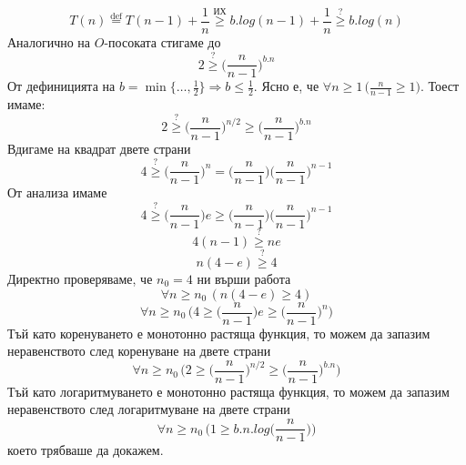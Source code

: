 \begin{solution}
\begin{itemize}
\begin{indstep}
			\begin{equation*}
				T(n)\overset{\text{def}}{=}T(n-1)+\frac1n\overset{\text{ИХ}}{\ge}b.log(n-1)+\frac1n\overset{?}{\ge}b.log(n)
			\end{equation*}
			Аналогично на $O$-посоката стигаме до
			\begin{equation*}
				2\overset{?}{\ge}\bigg(\frac{n}{n-1}\bigg)^{b.n}
			\end{equation*}
			От дефиницията на $b=\min\{\dots,\frac12\}\Rightarrow b\le\frac12$. Ясно е, че $\forall n\ge1\,\big(\frac{n}{n-1}\ge1\big)$. Тоест имаме:
			\begin{equation*}
				2\overset{?}{\ge}\bigg(\frac{n}{n-1}\bigg)^{n/2}\ge\bigg(\frac{n}{n-1}\bigg)^{b.n}
			\end{equation*}
			Вдигаме на квадрат двете страни
			\begin{equation*}
				4\overset{?}{\ge}\bigg(\frac{n}{n-1}\bigg)^n=\bigg(\frac{n}{n-1}\bigg)\bigg(\frac{n}{n-1}\bigg)^{n-1}
			\end{equation*}
			От анализа имаме
			\begin{equation*}
				4\overset{?}{\ge}\bigg(\frac{n}{n-1}\bigg)e\ge\bigg(\frac{n}{n-1}\bigg)\bigg(\frac{n}{n-1}\bigg)^{n-1}
			\end{equation*}
			\begin{equation*}
				4(n-1)\overset{?}{\ge}ne
			\end{equation*}
			\begin{equation*}
				n(4-e)\overset{?}{\ge}4
			\end{equation*}
			Директно проверяваме, че $n_0=4$ ни върши работа
			\begin{equation*}
				\forall n\ge n_0\,(n(4-e)\ge4)
			\end{equation*}
			\begin{equation*}
				\forall n\ge n_0\,\Bigg(4\ge\bigg(\frac{n}{n-1}\bigg)e\ge\bigg(\frac{n}{n-1}\bigg)^n\Bigg)
			\end{equation*}
			Тъй като коренуването е монотонно растяща функция, то можем да запазим неравенството след коренуване на двете страни
			\begin{equation*}
				\forall n\ge n_0\,\Bigg(2\ge\bigg(\frac{n}{n-1}\bigg)^{n/2}\ge\bigg(\frac{n}{n-1}\bigg)^{b.n}\Bigg)
			\end{equation*}
			Тъй като логаритмуването е монотонно растяща функция, то можем да запазим неравенството след логаритмуване на двете страни
			\begin{equation*}
				\forall n\ge n_0\,\Bigg(1\ge b.n.log\bigg(\frac{n}{n-1}\bigg)\Bigg)
			\end{equation*}
			което трябваше да докажем.
		\end{indstep}
	\end{itemize}
\end{solution}

